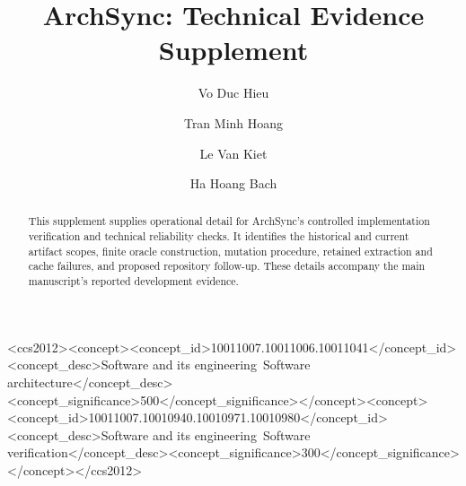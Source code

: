 \documentclass[manuscript,screen]{acmart}
\begin{document}
\title{ArchSync: Technical Evidence Supplement}
\author{Vo Duc Hieu}
\author{Tran Minh Hoang}
\author{Le Van Kiet}
\author{Ha Hoang Bach}
\renewcommand{\shortauthors}{Hieu et al.}
\begin{abstract}
This supplement supplies operational detail for ArchSync's controlled implementation verification and technical reliability checks. It identifies the historical and current artifact scopes, finite oracle construction, mutation procedure, retained extraction and cache failures, and proposed repository follow-up. These details accompany the main manuscript's reported development evidence.
\end{abstract}
\begin{CCSXML}
<ccs2012><concept><concept_id>10011007.10011006.10011041</concept_id><concept_desc>Software and its engineering~Software architecture</concept_desc><concept_significance>500</concept_significance></concept><concept><concept_id>10011007.10010940.10010971.10010980</concept_id><concept_desc>Software and its engineering~Software verification</concept_desc><concept_significance>300</concept_significance></concept></ccs2012>
\end{CCSXML}
\maketitle

\end{document}
